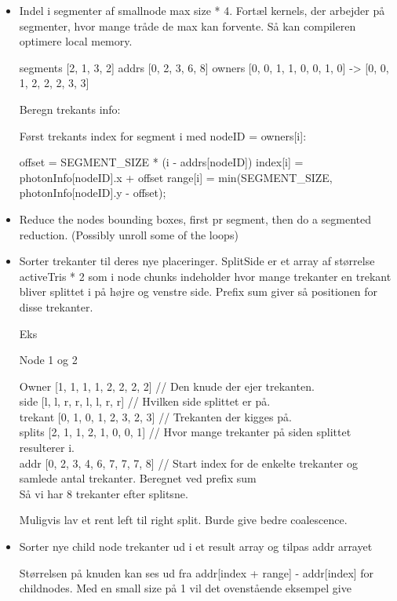 \begin{itemize}
\item
Indel i segmenter af smallnode max size * 4. Fortæl kernels, der
arbejder på segmenter, hvor mange tråde de max kan forvente. Så kan
compileren optimere local memory.

segments [2, 1, 3, 2]
addrs    [0, 2, 3, 6, 8]
owners   [0, 0, 1, 1, 0, 0, 1, 0] -> [0, 0, 1, 2, 2, 2, 3, 3]

Beregn trekants info:

Først trekants index for segment i med nodeID = owners[i]:

offset = SEGMENT_SIZE * (i - addrs[nodeID])
index[i] = photonInfo[nodeID].x + offset
range[i] = min(SEGMENT_SIZE, photonInfo[nodeID].y - offset);


\item
Reduce the nodes bounding boxes, first pr segment, then do a segmented
reduction. (Possibly unroll some of the loops)

\item
Sorter trekanter til deres nye placeringer. SplitSide er et array af
størrelse activeTris * 2 som i node chunks indeholder hvor mange
trekanter en trekant bliver splittet i på højre og venstre
side. Prefix sum giver så positionen for disse trekanter.

Eks

Node 1 og 2

Owner     [1, 1, 1, 1, 2, 2, 2, 2] // Den knude der ejer trekanten.\\
side      [l, l, r, r, l, l, r, r] // Hvilken side splittet er på.\\
trekant   [0, 1, 0, 1, 2, 3, 2, 3] // Trekanten der kigges på.\\
splits    [2, 1, 1, 2, 1, 0, 0, 1] // Hvor mange trekanter på siden splittet resulterer i.\\
addr      [0, 2, 3, 4, 6, 7, 7, 7, 8] // Start index for de enkelte trekanter og samlede antal trekanter. Beregnet ved prefix sum\\

Så vi har 8 trekanter efter splitsne.

Muligvis lav et rent left til right split. Burde give bedre coalescence.

\item
Sorter nye child node trekanter ud i et result array og tilpas addr arrayet

Størrelsen på knuden kan ses ud fra addr[index + range] - addr[index]
for childnodes. Med en small size på 1 vil det ovenstående eksempel give


\end{itemize}
